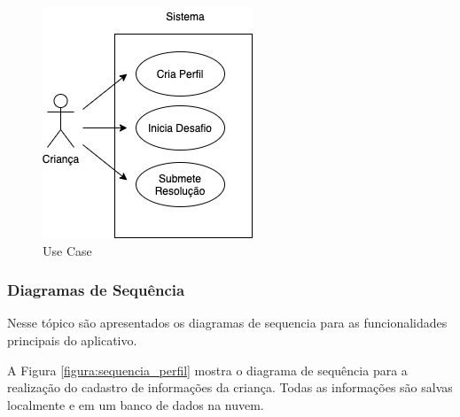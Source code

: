         \begin{figure}[H]
            \caption{Use Case}
            \begin{center}
                \includegraphics[width=\linewidth]{Imagens/cap3/Use Case.jpg}
            \end{center}
            \label{figura:use_case}
        \end{figure}
        
        \subsubsection{Diagramas de Sequência}
        
        Nesse tópico são apresentados os diagramas de sequencia para as funcionalidades principais do aplicativo.
        
        
        A Figura \ref{figura:sequencia_perfil} mostra o diagrama de sequência para a realização do cadastro de informações da criança. Todas as informações são salvas localmente e em um banco de dados na nuvem.
        

